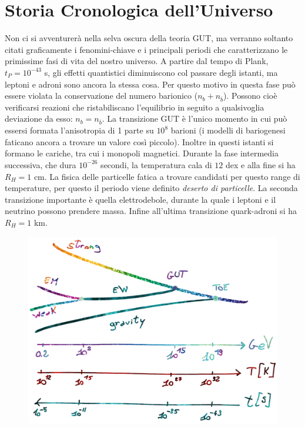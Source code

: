 \chapter{Storia Cronologica dell'Universo}\label{5:ch}

Non ci si avventurerà nella selva oscura della teoria GUT, ma verranno soltanto citati graficamente i fenomini-chiave e i principali periodi che caratterizzano le primissime fasi di vita del nostro universo. A partire dal tempo di Plank, $t_P=10^{-43}$ s, gli effetti quantistici diminuiscono col passare degli istanti, ma leptoni e adroni sono ancora la stessa cosa. Per questo motivo in questa fase può essere violata la conservazione del numero barionico ($n_b + n_{\overbar{b}}$). Possono cioè verificarsi reazioni che ristabiliscano l'equilibrio in seguito a qualsivoglia deviazione da esso: $n_b = n_{\overbar{b}}$. La transizione GUT è l'unico momento in cui può essersi formata l'anisotropia di 1 parte su $10^8$ barioni (i modelli di bariogenesi faticano ancora a trovare un valore così piccolo). Inoltre in questi istanti si formano le cariche, tra cui i monopoli magnetici. Durante la fase intermedia successiva, che dura $10^{-26}$ secondi, la temperatura cala di $12$ dex e alla fine si ha $R_H = 1$ cm. La fisica delle particelle fatica a trovare candidati per questo range di temperature, per questo il periodo viene definito \textit{deserto di particelle}. La seconda transizione importante è quella elettrodebole, durante la quale i leptoni e il neutrino possono prendere massa. Infine all'ultima transizione quark-adroni si ha $R_H = 1$ km. 

\begin{figure}[H]
    \centering
    \includegraphics[width=.75 \textwidth]{Pictures/5/fasiprimordiali.png}
    \label{fig:4}
\end{figure}


